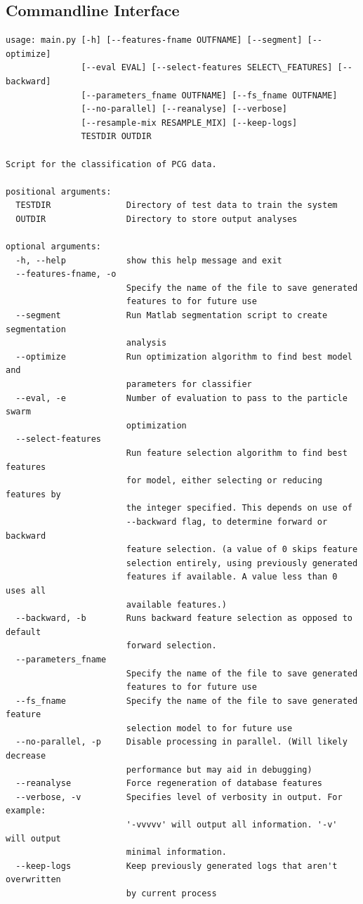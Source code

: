 \documentclass[titlepage, 12pt]{scrartcl} \usepackage{enumitem}
\begin{document}
\subsection{Commandline Interface}\label{appendixB}
\singlespacing
\lstset{basicstyle=\tiny, style=mystyle}
\begin{lstlisting}[numbers=none]
usage: main.py [-h] [--features-fname OUTFNAME] [--segment] [--optimize]
               [--eval EVAL] [--select-features SELECT\_FEATURES] [--backward]
               [--parameters_fname OUTFNAME] [--fs_fname OUTFNAME]
               [--no-parallel] [--reanalyse] [--verbose]
               [--resample-mix RESAMPLE_MIX] [--keep-logs]
               TESTDIR OUTDIR

Script for the classification of PCG data.

positional arguments:
  TESTDIR               Directory of test data to train the system
  OUTDIR                Directory to store output analyses

optional arguments:
  -h, --help            show this help message and exit
  --features-fname, -o
                        Specify the name of the file to save generated
                        features to for future use
  --segment             Run Matlab segmentation script to create segmentation
                        analysis
  --optimize            Run optimization algorithm to find best model and
                        parameters for classifier
  --eval, -e            Number of evaluation to pass to the particle swarm
                        optimization
  --select-features
                        Run feature selection algorithm to find best features
                        for model, either selecting or reducing features by
                        the integer specified. This depends on use of
                        --backward flag, to determine forward or backward
                        feature selection. (a value of 0 skips feature
                        selection entirely, using previously generated
                        features if available. A value less than 0 uses all
                        available features.)
  --backward, -b        Runs backward feature selection as opposed to default
                        forward selection.
  --parameters_fname
                        Specify the name of the file to save generated
                        features to for future use
  --fs_fname            Specify the name of the file to save generated feature
                        selection model to for future use
  --no-parallel, -p     Disable processing in parallel. (Will likely decrease
                        performance but may aid in debugging)
  --reanalyse           Force regeneration of database features
  --verbose, -v         Specifies level of verbosity in output. For example:
                        '-vvvvv' will output all information. '-v' will output
                        minimal information.
  --keep-logs           Keep previously generated logs that aren't overwritten
                        by current process
\end{lstlisting}
\doublespacing
\pagebreak{}
\end{document}
